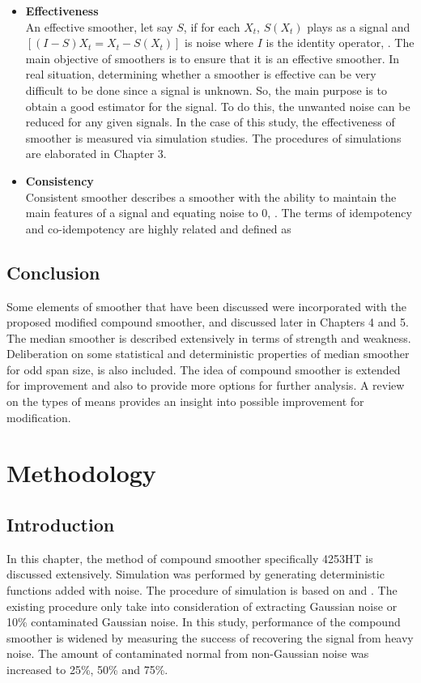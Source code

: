 \documentclass[12pt, a4paper]{report}
\begin{document}
\begin{itemize}
\item \textbf{Effectiveness}\\

An effective smoother, let say $S$, if for each $X_{t}$, $S(X_{t})$ plays as a signal and\\ $\left[(I-S)X_{t}=X_{t}-S(X_{t})\right]$ is noise where $I$ is the identity operator, \cite{rohwer2005}. The main objective of smoothers is to ensure that it is an effective smoother. In real situation, determining  whether a smoother is effective can be very difficult to be done since a signal is unknown. So, the main purpose is to obtain a good estimator for the signal. To do this, the unwanted noise can be reduced for any given signals. In the case of this study, the effectiveness of smoother is measured via simulation studies. The procedures of simulations are elaborated in Chapter 3.\\

\item \textbf{Consistency}\\

Consistent smoother describes a smoother with the ability to maintain the main features of a signal and equating noise to 0, \cite{rohwer2005}. The terms of idempotency and co-idempotency are highly related and defined as

\end{itemize}

\section{Conclusion}
Some elements of smoother that have been discussed were incorporated with the proposed modified compound smoother, and discussed later in Chapters 4 and 5. The median smoother is described extensively in terms of strength and weakness. Deliberation on some statistical and deterministic properties of median smoother for odd span size, is also included. The idea of compound smoother is extended for improvement and also to provide more options for further analysis. A review on the types of means provides an insight into possible improvement for modification.


\chapter{Methodology}

\section{Introduction}
In this chapter, the method of compound smoother specifically 4253HT is discussed extensively. Simulation was performed by generating deterministic functions added with noise. The procedure of simulation is based on \cite{donoho1994} and \cite{conradie2009}. The existing procedure only take into consideration of extracting Gaussian noise or 10\% contaminated Gaussian noise. 
In this study, performance of the compound smoother is widened by measuring the success of recovering the signal from heavy noise. The amount of contaminated normal from non-Gaussian noise was increased to 25\%, 50\% and 75\%. 
\end{document}
